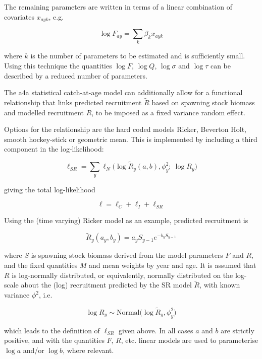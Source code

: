 \documentclass[
]{book}
\begin{document}
The remaining parameters are written in terms of a linear combination of covariates \(x_{ayk}\), e.g.

\begin{equation}
\log F_{ay} = \sum_k \beta_k x_{ayk}
\end{equation}

where \(k\) is the number of parameters to be estimated and is sufficiently small. Using this technique the quantities \(\log F\), \(\log Q\), \(\log \sigma\) and \(\log \tau\) can be described by a reduced number of parameters.

The a4a statistical catch-at-age model can additionally allow for a functional relationship that links predicted recruitment \(\tilde{R}\) based on spawning stock biomass and modelled recruitment \(R\), to be imposed as a fixed variance random effect.

Options for the relationship are the hard coded models Ricker, Beverton Holt, smooth hockey-stick or geometric mean. This is implemented by including a third component in the log-likelihood:

\begin{equation}
\ell_{SR} = \sum_y \ell_N \Big( \log \tilde{R}_y(a, b), \phi_y^2 ;\ \log R_y \Big)
\end{equation}

giving the total log-likelihood

\begin{equation}
\ell = \ell_C + \ell_I + \ell_{SR}
\end{equation}

Using the (time varying) Ricker model as an example, predicted recruitment is

\begin{equation}
\tilde{R}_y(a_y,b_y) = a_y S_{y-1} e^{-b_y S_{y-1}}
\end{equation}

where \(S\) is spawning stock biomass derived from the model parameters \(F\) and \(R\), and the fixed quantities \(M\) and mean weights by year and age. It is assumed that \(R\) is log-normally distributed, or equivalently, normally distributed on the log-scale about the (log) recruitment predicted by the SR model \(\tilde{R}\), with known variance \(\phi^2\), i.e.

\begin{equation}
\log R_y \sim \text{Normal} \Big( \log \tilde{R}_y, \phi_y^2 \Big)
\end{equation}

which leads to the definition of \(\ell_{SR}\) given above. In all cases \(a\) and \(b\) are strictly positive, and with the quantities \(F\), \(R\), etc. linear models are used to parameterise \(\log a\) and/or \(\log b\), where relevant.
\end{document}
